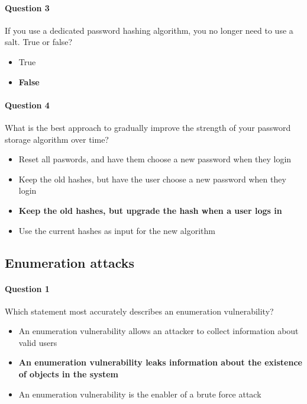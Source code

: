 \documentclass[titlepage]{article}
\begin{document}
    \paragraph{Question 3} If you use a dedicated password hashing algorithm, you no longer need to use a salt. True or false?
    \begin{itemize}
        \item True
        \item \textbf{False} \checkmark
    \end{itemize}
    \paragraph{Question 4} What is the best approach to gradually improve the strength of your password storage algorithm over time?
    \begin{itemize}
        \item Reset all paswords, and have them choose a new password when they login
        \item Keep the old hashes, but have the user choose a new password when they login
        \item \textbf{Keep the old hashes, but upgrade the hash when a user logs in} \checkmark
        \item Use the current hashes as input for the new algorithm
    \end{itemize}
    \subsection{Enumeration attacks}
    \paragraph{Question 1} Which statement most accurately describes an enumeration vulnerability?
    \begin{itemize}
        \item An enumeration vulnerability allows an attacker to collect information about valid users
        \item \textbf{An enumeration vulnerability leaks information about the existence of objects in the system} \checkmark
        \item An enumeration vulnerability is the enabler of a brute force attack
    \end{itemize}
\end{document}
